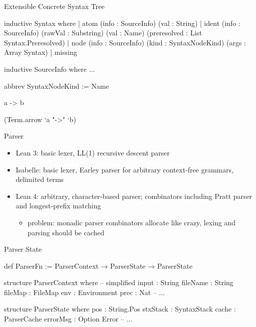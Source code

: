 \documentclass[en,t]{sdqbeamer}
\begin{document}
\begin{frame}{Extensible Concrete Syntax Tree}
\begin{leancode}
inductive Syntax where
  | atom   (info : SourceInfo) (val : String)
  | ident  (info : SourceInfo) (rawVal : Substring) (val : Name) (preresolved : List Syntax.Preresolved)
  | node   (info : SourceInfo) (kind : SyntaxNodeKind) (args : Array Syntax)
  | missing

inductive SourceInfo where ...

abbrev SyntaxNodeKind := Name
\end{leancode}

\begin{leancode}
a -> b
\end{leancode}

\begin{leancode}
(Term.arrow `a "->" `b)
\end{leancode}
\end{frame}

\begin{frame}{Parser}
  \begin{itemize}
  \item Lean 3: basic lexer, LL(1) recursive descent parser
  \item Isabelle: basic lexer, Earley parser for arbitrary context-free grammars, delimited terms
    \pause
  \item Lean 4: arbitrary, character-based parser; combinators including Pratt
    parser and longest-prefix matching
    \pause
    \begin{itemize}
    \item problem: monadic parser combinators allocate like crazy, lexing and parsing should
      be cached
    \end{itemize}
  \end{itemize}
\end{frame}

\begin{frame}[fragile]{Parser State}
\begin{leancode}
def ParserFn := ParserContext → ParserState → ParserState

structure ParserContext where  -- simplified
  input    : String
  fileName : String
  fileMap  : FileMap
  env      : Environment
  prec     : Nat
  -- ...

structure ParserState where
  pos      : String.Pos
  stxStack : SyntaxStack
  cache    : ParserCache
  errorMsg : Option Error
  -- ...
\end{leancode}
\end{frame}
\end{document}
